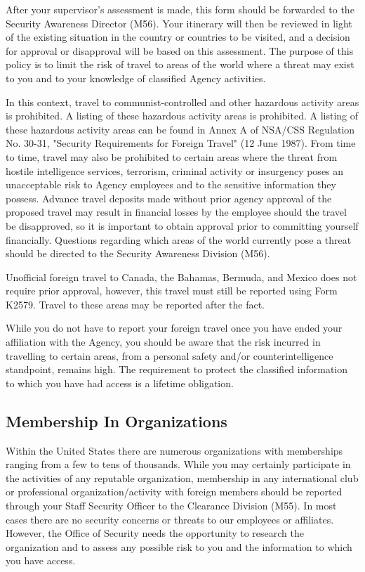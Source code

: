 \documentclass[a4]{article}
\begin{document}
After your supervisor's assessment is made, this form should be forwarded to
the Security Awareness Director (M56).  Your itinerary will then be reviewed in
light of the existing situation in the country or countries to be visited, and
a decision for approval or disapproval will be based on this assessment.  The
purpose of this policy is to limit the risk of travel to areas of the world
where a threat may exist to you and to your knowledge of classified Agency
activities.

In this context, travel to communist-controlled and other hazardous activity
areas is prohibited.  A listing of these hazardous activity areas is
prohibited.  A listing of these hazardous activity areas can be found in Annex
A of NSA/CSS Regulation No. 30-31, "Security Requirements for Foreign Travel"
(12 June 1987).  From time to time, travel may also be prohibited to certain
areas where the threat from hostile intelligence services, terrorism, criminal
activity or insurgency poses an unacceptable risk to Agency employees and to
the sensitive information they possess.  Advance travel deposits made without
prior agency approval of the proposed travel may result in financial losses by
the employee should the travel be disapproved, so it is important to obtain
approval prior to committing yourself financially.  Questions regarding which
areas of the world currently pose a threat should be directed to the Security
Awareness Division (M56).

Unofficial foreign travel to Canada, the Bahamas, Bermuda, and Mexico does not
require prior approval, however, this travel must still be reported using Form
K2579.  Travel to these areas may be reported after the fact.

While you do not have to report your foreign travel once you have ended your
affiliation with the Agency, you should be aware that the risk incurred in
travelling to certain areas, from a personal safety and/or counterintelligence
standpoint, remains high.  The requirement to protect the classified
information to which you have had access is a lifetime obligation.

\subsection{Membership In Organizations}

Within the United States there are numerous organizations with memberships
ranging from a few to tens of thousands.  While you may certainly participate
in the activities of any reputable organization, membership in any
international club or professional organization/activity with foreign members
should be reported through your Staff Security Officer to the Clearance
Division (M55).  In most cases there are no security concerns or threats to
our employees or affiliates.  However, the Office of Security needs the
opportunity to research the organization and to assess any possible risk to
you and the information to which you have access.
\end{document}
